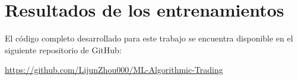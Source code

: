 \setlength{\parindent}{0em}

\section{Resultados de los entrenamientos}\label{anexoA}

El código completo desarrollado para este trabajo se encuentra disponible en el siguiente repositorio de GitHub:

\url{https://github.com/LijunZhou000/ML-Algorithmic-Trading}